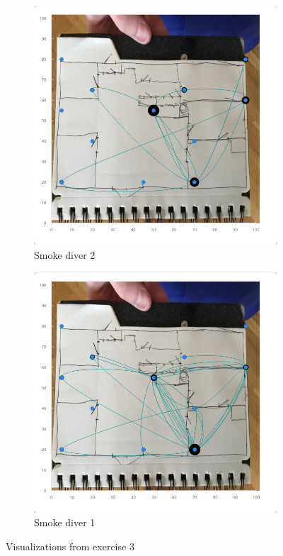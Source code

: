 \documentclass[../Main/thesis.tex]{subfiles}
\begin{document}
\begin{figure}[h]
	\centering
	\begin{subfigure}{0.45\textwidth}
		\includegraphics[width=\textwidth]{../fig/eval_3_remi}
		\caption{Smoke diver 2}
		\label{fig:eval-visualization-3-1-app}
	\end{subfigure}
	\begin{subfigure}{0.45\textwidth}
		\includegraphics[width=\textwidth]{../fig/eval_3_fredrik}
		\caption{Smoke diver 1}
		\label{fig:eval-visualization-3-2-app}
	\end{subfigure}
	\caption{Visualizations from exercise 3}
	\label{fig:eval-visualization-3-app}
\end{figure}
\end{document}
